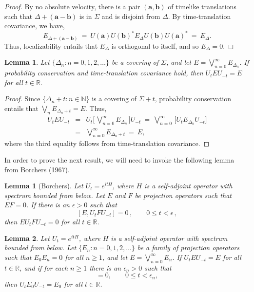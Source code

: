 \documentclass[11pt]{article}
\newtheorem*{lemma*}{Lemma}
\newtheorem{lemma}{Lemma}
\theoremstyle{remark}
\begin{document}
\begin{appendix}
\begin{proof}  By no absolute velocity, there is a pair $(\mathbf{a},\mathbf{b})$
  of timelike translations such that $\Delta +(\mathbf{a}-\mathbf{b})$
  is in $\Sigma$ and is disjoint from $\Delta$.  By time-translation
  covariance, we have,
  \begin{equation} E_{\Delta
      +(\mathbf{a}-\mathbf{b})}\:=\:U(\mathbf{a})U(\mathbf{b})^{*}
    E_{\Delta}U(\mathbf{b})U(\mathbf{a})^{*}\:=\:E_{\Delta}
    .\end{equation} Thus, localizability entails that $E_{\Delta}$ is
  orthogonal to itself, and so $E_{\Delta}=0$.  \end{proof}

\begin{lemma} Let $\{ \Delta _{n}:n=0,1,2,\dots 
  \}$ be a covering of $\Sigma$, and let $E=\bigvee
  _{n=0}^{\infty}E_{\Delta _{n}}$.  If probability conservation and
  time-translation covariance hold, then $U_{t}EU_{-t}=E$ for all
  $t\in \mathbb{R}$.
  \label{commute} \end{lemma}

\begin{proof}  Since $\{ \Delta _{n}+t:n\in \mathbb{N} \}$ is a covering of $\Sigma +{t}$,
  probability conservation entails that $\bigvee _{n}E_{\Delta
    _{n}+t}=E$.  Thus,
\begin{eqnarray}
U_{t}EU_{-t} &=& U_{t}\biggl[ \,\bigvee _{n=0}^{\infty} 
E_{\Delta _{n}} \,\biggr] U_{-t} \:=\: 
\bigvee _{n=0}^{\infty}\,\biggl[ U_{t}E_{\Delta
    _{n}}U_{-t} \biggr] \\
&=& \bigvee _{n=0}^{\infty}E_{\Delta _{n}+t} \: =\:
    E, \end{eqnarray} where the third equality follows from
    time-translation covariance.  \end{proof}

In order to prove the next result, we will need to invoke the
following lemma from Borchers (1967).
\begin{lemma*}[Borchers] Let $U_{t}=e^{itH}$, where $H$ is a self-adjoint
  operator with spectrum bounded from below.  Let $E$ and $F$ be
  projection operators such that $EF=0$.  If there is an $\epsilon >0$
  such that \[ [E,U_{t}FU_{-t}]=0 \,, \qquad 0\leq t<\epsilon \,,\]
  then $EU_{t}FU_{-t}=0$ for all $t\in \mathbb{R}$.
\end{lemma*}

\begin{lemma} Let $U_{t}=e^{itH}$,
  where $H$ is a self-adjoint operator with spectrum bounded from
  below.  Let $\{ E_{n}:n=0,1,2,\dots \}$ be a family of projection
  operators such that $E_{0}E_{n}=0$ for all $n\geq 1$, and let
  $E=\bigvee _{n=0}^{\infty}E_{n}$.  If $U_{t}EU_{-t}=E$ for all $t\in
  \mathbb{R}$, and if for each $n\geq 1$ there is an $\epsilon _{n}>0$
  such that
\begin{equation} [E_{0},U_{t}E_{n}U_{-t}]=0 , \qquad 
0\leq t<\epsilon _{n} , \label{wiggle} \end{equation} then $U_{t}E_{0}U_{-t}=E_{0}$ for all
$t\in \mathbb{R}$.
\label{root} \end{lemma}


\end{appendix}
\end{document}
